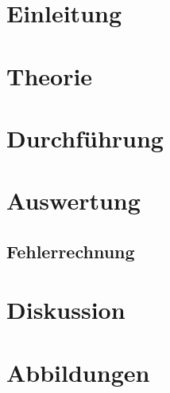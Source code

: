 


	
	\section{Einleitung}\label{sec:Einleitung}
		

		 
	
	
	\section{Theorie}\label{sec:Theorie}
		
	

	\section{Durchführung}\label{sec:Durchführung}
		
	

	\section{Auswertung}\label{sec:Auswertung}
		
		
	\newpage
	\subsection{Fehlerrechnung}\label{sec:Fehlerrechnung}
		
	
	\newpage
	\section{Diskussion}\label{sec:Diskussion}
		
	
	\newpage
	
	\section{Abbildungen}
	
